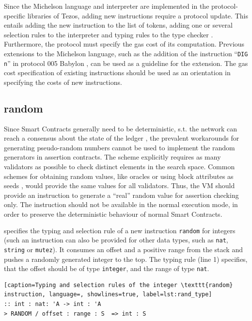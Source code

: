 Since the Michelson language and interpreter are implemented in the protocol-specific libraries of Tezos, adding new instructions require a protocol update. This entails adding the new instruction to the list of tokens, adding one or several selection rules to the interpreter and typing rules to the type checker \cite{tezos_repo}. Furthermore, the protocol must specify the gas cost of its computation. Previous extensions to the Michelson language, such as the addition of the instruction ``\texttt{DIG n}'' in protocol 005 Babylon \cite{tezos_michelson_ext}, can be used as a guideline for the extension. The gas cost specification of existing instructions \cite{tezos_repo_gas} should be used as an orientation in specifying the costs of new instructions.

\subsection{random}\label{sec:random}
Since Smart Contracts generally need to be deterministic, s.t. the network can reach a consensus about the state of the ledger \cite{chatterjee_probabilistic_2019}, the prevalent workarounds for generating pseudo-random numbers cannot be used to implement the random generators in assertion contracts. The scheme explicitly requires as many validators as possible to check distinct elements in the search space. Common schemes for obtaining random values, like oracles or using block attributes as seeds \cite{chatterjee_probabilistic_2019}, would provide the same values for all validators. Thus, the VM should provide an instruction to generate a ``real'' random value for assertion checking only. The instruction should not be available in the normal execution mode, in order to preserve the deterministic behaviour of normal Smart Contracts.

 specifies the typing and selection rule of a new instruction \texttt{random} for integers (such an instruction can also be provided for other data types, such as \texttt{nat}, \texttt{string} or \texttt{mutez}). It consumes an offset and a positive range from the stack and pushes a randomly generated integer to the top. The typing rule (line 1) specifies, that the offset should be of type \texttt{integer}, and the range of type \texttt{nat}.
\lstset{upquote=true}
\begin{lstlisting}[caption=Typing and selection rules of the integer \texttt{random} instruction, language=, showlines=true, label=lst:rand_type]
:: int : nat: 'A -> int : 'A
> RANDOM / offset : range : S  => int : S
\end{lstlisting}

